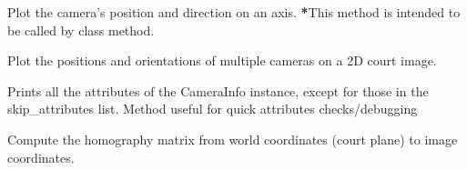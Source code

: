 \documentclass[letterpaper,10pt,english]{sphinxmanual}
\begin{document}
\begin{fulllineitems}
\begin{fulllineitems}
\end{fulllineitems}


\begin{fulllineitems}
\label{\detokenize{CameraUtils:CameraUtils.Camera.PlotCamera2D}}
\pysigstartsignatures
{}
\pysigstopsignatures
\sphinxAtStartPar
Plot the camera’s position and direction on an axis. {\color{red}\bfseries{}*}This method is intended to be called by  class method.

\end{fulllineitems}


\begin{fulllineitems}
\label{\detokenize{CameraUtils:CameraUtils.Camera.PlotMultipleCameras2D}}
\pysigstartsignatures
{}
\pysigstopsignatures
\sphinxAtStartPar
{}
Plot the positions and orientations of multiple cameras on a 2D court image.

\end{fulllineitems}


\begin{fulllineitems}
\label{\detokenize{CameraUtils:CameraUtils.Camera.PrintAttributes}}
\pysigstartsignatures
{}
\pysigstopsignatures
\sphinxAtStartPar
Prints all the attributes of the CameraInfo instance, except for those in the skip\_attributes list.
Method useful for quick attributes checks/debugging

\end{fulllineitems}


\begin{fulllineitems}
\label{\detokenize{CameraUtils:CameraUtils.Camera.FindHomography}}
\pysigstartsignatures
{}
\pysigstopsignatures
\sphinxAtStartPar
Compute the homography matrix from world coordinates (court plane) to image coordinates.


\end{fulllineitems}
\end{fulllineitems}
\end{document}
